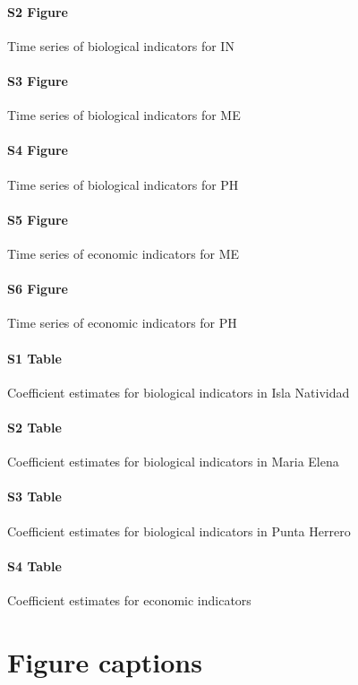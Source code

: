 \documentclass{frontiersSCNS}
\begin{document}
\paragraph*{S2 Figure}
\label{S2_Figure}

Time series of biological indicators for IN

\paragraph*{S3 Figure}
\label{S3_Figure}

Time series of biological indicators for ME

\paragraph*{S4 Figure}
\label{S4_Figure}

Time series of biological indicators for PH

\paragraph*{S5 Figure}
\label{S5_Figure}

Time series of economic indicators for ME

\paragraph*{S6 Figure}
\label{S6_Figure}

Time series of economic indicators for PH

\paragraph*{S1 Table}
\label{S1_Table}

Coefficient estimates for biological indicators in Isla Natividad

\paragraph*{S2 Table}
\label{S2_Table}

Coefficient estimates for biological indicators in Maria Elena

\paragraph*{S3 Table}
\label{S3_Table}

Coefficient estimates for biological indicators in Punta Herrero

\paragraph*{S4 Table}
\label{S4_Table}

Coefficient estimates for economic indicators



\section*{Figure captions}
\end{document}
